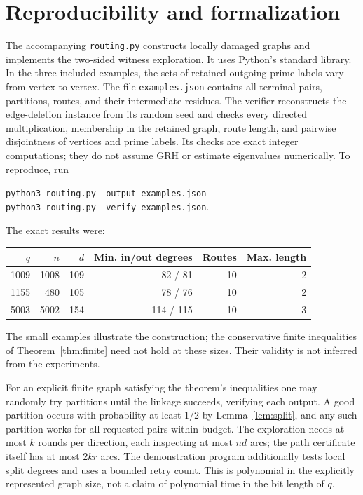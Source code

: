 \documentclass[11pt]{article}
\theoremstyle{remark}\newtheorem{remark}[theorem]{Remark}
\begin{document}
\section{Reproducibility and formalization}
The accompanying \texttt{routing.py} constructs locally damaged graphs and implements the two-sided witness exploration. It uses Python's standard library. In the three included examples, the sets of retained outgoing prime labels vary from vertex to vertex. The file \texttt{examples.json} contains all terminal pairs, partitions, routes, and their intermediate residues. The verifier reconstructs the edge-deletion instance from its random seed and checks every directed multiplication, membership in the retained graph, route length, and pairwise disjointness of vertices and prime labels. Its checks are exact integer computations; they do not assume GRH or estimate eigenvalues numerically. To reproduce, run
\begin{center}\small\texttt{python3 routing.py --output examples.json}\\
\texttt{python3 routing.py --verify examples.json}.
\end{center}
The exact results were:
\begin{center}
\begin{tabular}{rrrrrr}
\toprule
$q$ & $n$ & $d$ & Min. in/out degrees & Routes & Max. length\\
\midrule
1009 & 1008 & 109 & 82 / 81 & 10 & 2\\
1155 & 480 & 105 & 78 / 76 & 10 & 2\\
5003 & 5002 & 154 & 114 / 115 & 10 & 3\\
\bottomrule
\end{tabular}
\end{center}
The small examples illustrate the construction; the conservative finite inequalities of Theorem~\ref{thm:finite} need not hold at these sizes. Their validity is not inferred from the experiments.

For an explicit finite graph satisfying the theorem's inequalities one may randomly try partitions until the linkage succeeds, verifying each output. A good partition occurs with probability at least $1/2$ by Lemma~\ref{lem:split}, and any such partition works for all requested pairs within budget. The exploration needs at most $k$ rounds per direction, each inspecting at most $nd$ arcs; the path certificate itself has at most $2kr$ arcs. The demonstration program additionally tests local split degrees and uses a bounded retry count. This is polynomial in the explicitly represented graph size, not a claim of polynomial time in the bit length of $q$.
\end{document}
